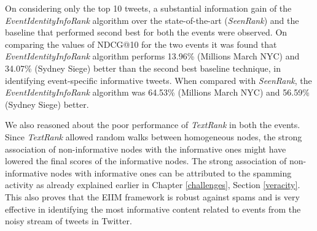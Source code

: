 On considering only the top 10 tweets, a substantial information gain of the \textit{EventIdentityInfoRank} algorithm over the state-of-the-art (\textit{SeenRank}) and the baseline that performed second best for both the events were observed. On comparing the values of NDCG@10 for the two events it was found that \textit{EventIdentityInfoRank} algorithm performs 13.96\% (Millions March NYC) and 34.07\% (Sydney Siege) better than the second best baseline technique, in identifying event-specific informative tweets. When compared with \textit{SeenRank}, the \textit{EventIdentityInfoRank} algorithm was 64.53\% (Millions March NYC) and 56.59\% (Sydney Siege) better. 

We also reasoned about the poor performance of \textit{TextRank} in both the events. Since \textit{TextRank} allowed random walks between homogeneous nodes, the strong association of non-informative nodes with the informative ones might have lowered the final scores of the informative nodes. The strong association of non-informative nodes with informative ones can be attributed to the spamming activity as already explained earlier in Chapter \ref{challenges}, Section \ref{veracity}. This also proves that the EIIM framework is robust against spams and is very effective in identifying the most informative content related to events from the noisy stream of tweets in Twitter. 

